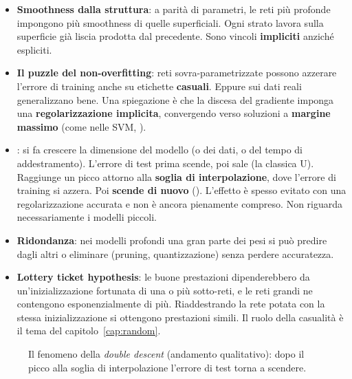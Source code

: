 \begin{itemize}
  \item \textbf{Smoothness dalla struttura}: a parità di parametri, le reti più profonde impongono più smoothness di
        quelle superficiali. Ogni strato lavora sulla superficie già liscia prodotta dal precedente. Sono vincoli
        \textbf{impliciti} anziché espliciti.
  \item \textbf{Il puzzle del non-overfitting}: reti sovra-parametrizzate possono azzerare l'errore di training anche
        su etichette \textbf{casuali}. Eppure sui dati reali generalizzano bene. Una spiegazione è che la discesa
        del gradiente imponga una \textbf{regolarizzazione implicita}, convergendo verso soluzioni a
        \textbf{margine massimo} (come nelle SVM, ).
  \item {}: si fa crescere la dimensione del modello (o dei dati, o del tempo di
        addestramento). L'errore di test prima scende, poi sale (la classica U). Raggiunge un picco attorno alla
        \textbf{soglia di interpolazione}, dove l'errore di training si azzera. Poi \textbf{scende di nuovo}
        (). L'effetto è spesso evitato con una regolarizzazione accurata e non è ancora
        pienamente compreso. Non riguarda necessariamente i modelli piccoli.
  \item \textbf{Ridondanza}: nei modelli profondi una gran parte dei pesi si può predire dagli altri o eliminare
        (pruning, quantizzazione) senza perdere accuratezza.
  \item \textbf{Lottery ticket hypothesis}: le buone prestazioni dipenderebbero da un'inizializzazione fortunata di
        una o più sotto-reti, e le reti grandi ne contengono esponenzialmente di più. Riaddestrando la rete potata
        con la stessa inizializzazione si ottengono prestazioni simili. Il ruolo della casualità è il tema del
        capitolo~\ref{cap:random}.
\end{itemize}

\begin{figure}[ht]
\centering
{}
\caption{Il fenomeno della \emph{double descent} (andamento qualitativo): dopo il picco alla soglia di interpolazione
l'errore di test torna a scendere.}
\label{fig:double-descent}
\end{figure}

